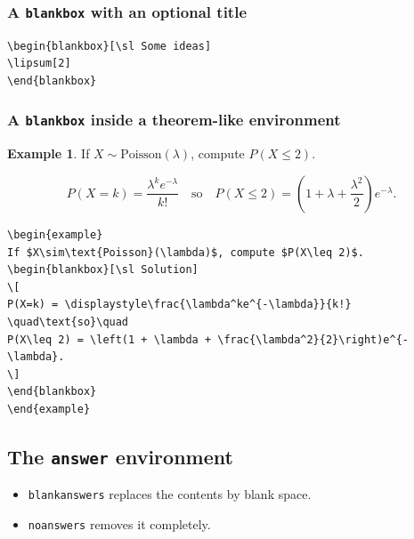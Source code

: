 \documentclass{article}
\theoremstyle{definition}
\newtheorem{example}{Example}
\begin{document}
\subsubsection{A {\tt blankbox} with an optional title}

\begin{Verbatim}[frame=single]
\begin{blankbox}[\sl Some ideas]
\lipsum[2]
\end{blankbox}
\end{Verbatim}
\begin{blankbox}
\lipsum[2]
\end{blankbox}

\subsubsection{A {\tt blankbox} inside a theorem-like environment}

\begin{example}
If $X\sim\text{Poisson}(\lambda)$, compute $P(X\leq 2)$.
\begin{blankbox}[\sl Solution]
\[
P(X=k) = \displaystyle\frac{\lambda^ke^{-\lambda}}{k!}
\quad\text{so}\quad
P(X\leq 2) = \left(1 + \lambda + \frac{\lambda^2}{2}\right)e^{-\lambda}.
\]
\end{blankbox}
\end{example}
\begin{Verbatim}[frame=single]
\begin{example}
If $X\sim\text{Poisson}(\lambda)$, compute $P(X\leq 2)$.
\begin{blankbox}[\sl Solution]
\[
P(X=k) = \displaystyle\frac{\lambda^ke^{-\lambda}}{k!}
\quad\text{so}\quad
P(X\leq 2) = \left(1 + \lambda + \frac{\lambda^2}{2}\right)e^{-\lambda}.
\]
\end{blankbox}
\end{example}
\end{Verbatim}

\subsection{The {\tt answer} environment}
\begin{itemize}
\item {\tt blankanswers} replaces the contents by blank space. 
\item {\tt noanswers} removes it completely.
\end{itemize}
\end{document}
